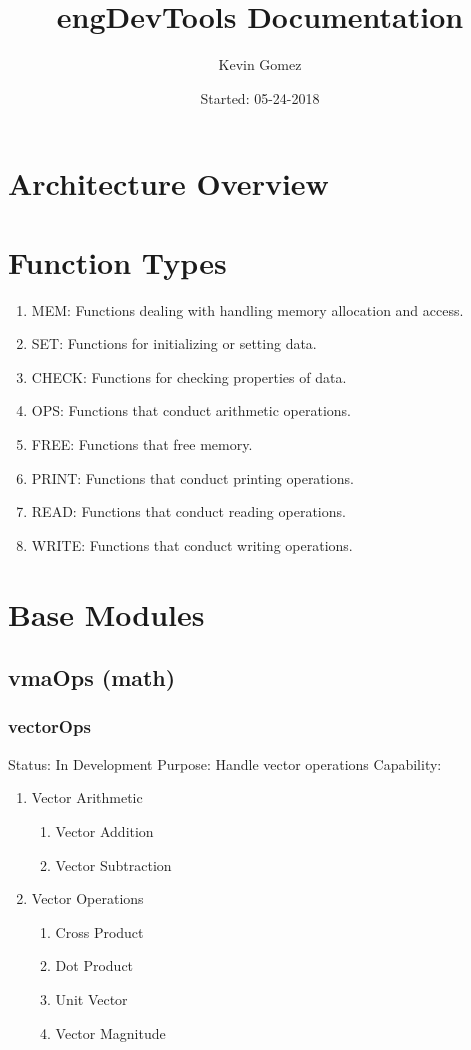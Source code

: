 \documentclass{article}
\title{engDevTools Documentation}
\date{Started: 05-24-2018}
\author{Kevin Gomez}
\begin{document}
	
	\maketitle
	\newpage
	
	\section{Architecture Overview}
	
	\section{Function Types}
		\begin{enumerate}
			\item MEM: Functions dealing with handling memory allocation and access.
			\item SET: Functions for initializing or setting data.
			\item CHECK: Functions for checking properties of data.
			\item OPS: Functions that conduct arithmetic operations.
			\item FREE: Functions that free memory.
			\item PRINT: Functions that conduct printing operations.
			\item READ: Functions that conduct reading operations.
			\item WRITE: Functions that conduct writing operations.
		\end{enumerate}
	
	\section{Base Modules}
		\subsection{vmaOps (math)}
			\subsubsection{vectorOps}
				Status: In Development \newline
				Purpose: Handle vector operations \newline
				Capability:
				\begin{enumerate}
					\item Vector Arithmetic
					\begin{enumerate}
						\item Vector Addition
						\item Vector Subtraction
					\end{enumerate}
					\item Vector Operations
					\begin{enumerate}
						\item Cross Product
						\item Dot Product
						\item Unit Vector
						\item Vector Magnitude
					\end{enumerate}
				\end{enumerate}
				
\end{document}
